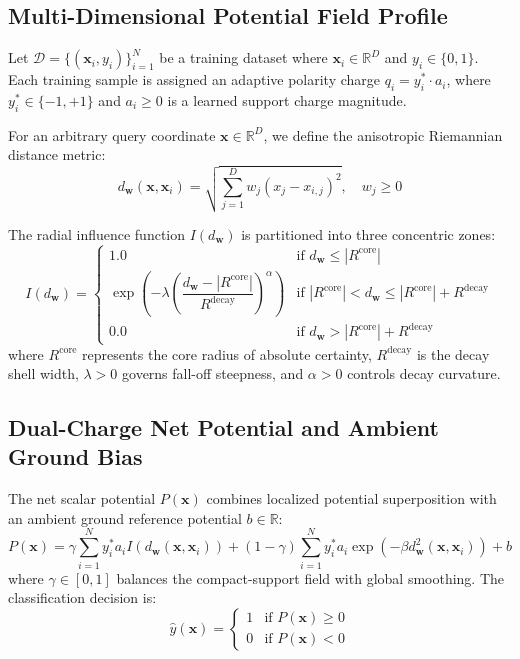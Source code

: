 \documentclass[11pt,a4paper]{article}
\begin{document}
\subsection{Multi-Dimensional Potential Field Profile}
Let $\mathcal{D} = \{(\mathbf{x}_i, y_i)\}_{i=1}^N$ be a training dataset where $\mathbf{x}_i \in \mathbb{R}^D$ and $y_i \in \{0, 1\}$. Each training sample is assigned an adaptive polarity charge $q_i = y_i^* \cdot a_i$, where $y_i^* \in \{-1, +1\}$ and $a_i \ge 0$ is a learned support charge magnitude.

For an arbitrary query coordinate $\mathbf{x} \in \mathbb{R}^D$, we define the anisotropic Riemannian distance metric:
\begin{equation}
d_{\mathbf{w}}(\mathbf{x}, \mathbf{x}_i) = \sqrt{\sum_{j=1}^{D} w_j (x_j - x_{i,j})^2}, \quad w_j \ge 0
\end{equation}

The radial influence function $I(d_{\mathbf{w}})$ is partitioned into three concentric zones:
\begin{equation}
I(d_{\mathbf{w}}) = \begin{cases}
1.0 & \text{if } d_{\mathbf{w}} \le |R^{\mathrm{core}}| \\[6pt]
\exp\!\left(-\lambda \left(\dfrac{d_{\mathbf{w}} - |R^{\mathrm{core}}|}{R^{\mathrm{decay}}}\right)^{\!\alpha}\right) & \text{if } |R^{\mathrm{core}}| < d_{\mathbf{w}} \le |R^{\mathrm{core}}| + R^{\mathrm{decay}} \\[8pt]
0.0 & \text{if } d_{\mathbf{w}} > |R^{\mathrm{core}}| + R^{\mathrm{decay}}
\end{cases}
\end{equation}
where $R^{\mathrm{core}}$ represents the core radius of absolute certainty, $R^{\mathrm{decay}}$ is the decay shell width, $\lambda > 0$ governs fall-off steepness, and $\alpha > 0$ controls decay curvature.

\subsection{Dual-Charge Net Potential and Ambient Ground Bias}
The net scalar potential $P(\mathbf{x})$ combines localized potential superposition with an ambient ground reference potential $b \in \mathbb{R}$:
\begin{equation}
P(\mathbf{x}) = \gamma \sum_{i=1}^{N} y_i^* a_i I(d_{\mathbf{w}}(\mathbf{x}, \mathbf{x}_i)) + (1 - \gamma) \sum_{i=1}^{N} y_i^* a_i \exp\left(-\beta d_{\mathbf{w}}^2(\mathbf{x}, \mathbf{x}_i)\right) + b
\end{equation}
where $\gamma \in [0, 1]$ balances the compact-support field with global smoothing. The classification decision is:
\begin{equation}
\hat{y}(\mathbf{x}) = \begin{cases} 1 & \text{if } P(\mathbf{x}) \ge 0 \\ 0 & \text{if } P(\mathbf{x}) < 0 \end{cases}
\end{equation}
\end{document}
